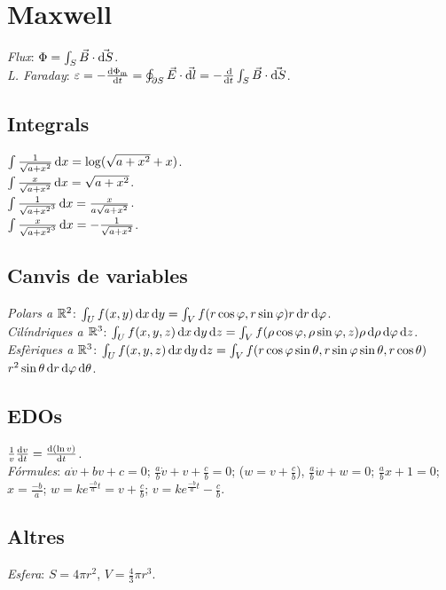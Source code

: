 \section{Maxwell}
\emph{Flux}: $\Phi = \int_S \vec{B}\cdot \vec{\dif S}$. \\
\emph{L. Faraday}: $\varepsilon = -\frac{\dif \Phi_{\text{m}}}{\dif t}=\oint_{\partial S} \vec{E} \cdot \vec{\dif l} = -\frac{\dif}{\dif t}\int_S \vec{B} \cdot \vec{\dif S}$.

\addtocounter{section}{1}
\noindent\makebox[\linewidth]{\rule{\linewidth}{0.5pt}}

\subsection{Integrals}
\ci $\int \frac{1}{\sqrt{a+x^2}}\dif x = \log (\sqrt{a+x^2} + x)$. \\
\ci $\int \frac{x}{\sqrt{a+x^2}}\dif x = \sqrt{a+x^2}$. \\
\ci $\int \frac{1}{\sqrt{a+x^2}^3}\dif x = \frac{x}{a\sqrt{a+x^2}}$. \\
\ci $\int \frac{x}{\sqrt{a+x^2}^3}\dif x = -\frac{1}{\sqrt{a+x^2}}$.

\subsection{Canvis de variables}
\emph{Polars a $\mathbb{R}^2$}: $\int_U f( x,y ) \dif x\dif y = \int_V f( r\cos\varphi, r\sin\varphi )r \dif r\dif \varphi$. \\
\emph{Cilíndriques a $\mathbb{R}^3$}: $\int_U f( x,y,z ) \dif x\dif y\dif z = \int_V f( \rho\cos\varphi, \rho\sin\varphi, z )\rho \dif \rho\dif \varphi\dif z$. \\
\emph{Esfèriques a $\mathbb{R}^3$}: $\int_U f( x,y,z ) \dif x\dif y\dif z = \int_V f ( r\cos\varphi\sin\theta, r\sin\varphi\sin\theta, r\cos\theta )$ $r^2\sin\theta \dif r\dif \varphi\dif \theta$.

\subsection{EDOs}
\ci $\frac{1}{v}\frac{\dif v}{\dif t} = \frac{\dif\, (\ln v)}{\dif t}$. \\
\emph{Fórmules}: $a\dot{v}+bv+c=0$; $\frac{a}{b}\dot{v}+v+\frac{c}{b}=0$; ($w=v+\frac{c}{b}$), $\frac{a}{b}\dot{w}+w=0$; $\frac{a}{b}x+1=0$; $x=\frac{-b}{a}$; $w=k e^{\frac{-b}{a}t}=v+\frac{c}{b}$; $v=ke^{\frac{-b}{a}t}-\frac{c}{b}$.

\subsection{Altres}
\emph{Esfera}: $S=4\pi r^2$, $V=\frac{4}{3}\pi r^3$.
